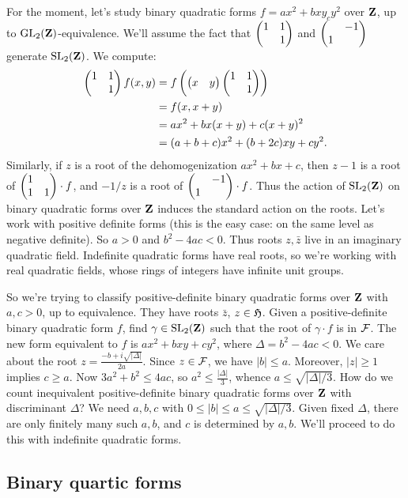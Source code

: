 For the moment, let's study binary quadratic forms $f=a x^2+b x y_c y^2$ 
over $\mathbf{Z}$, up to $\operatorname{GL}_2(\mathbf{Z})$-equivalence. We'll assume the fact that 
$\begin{pmatrix} 1 & 1 \\  & 1 \end{pmatrix}$ and $\begin{pmatrix}  & -1 \\ 1 &  \end{pmatrix}$ generate $\operatorname{SL}_2(\mathbf{Z})$. We compute: 
\begin{align*}
  \begin{pmatrix} 1 & 1 \\  & 1 \end{pmatrix} f(x,y) &= f\left(\begin{pmatrix} x & y \end{pmatrix} \begin{pmatrix} 1 & 1 \\  & 1 \end{pmatrix}\right) \\
    &= f(x,x+y) \\
    &= a x^2+b x(x+y)+c(x+y)^2 \\
    &= (a+b+c) x^2 +(b+2 c) x y + c y^2 .
\end{align*}
Similarly, if $z$ is a root of the dehomogenization 
$a x^2+b x+c$, then $z-1$ is a root of $\begin{pmatrix} 1 &  \\ 1 & 1 \end{pmatrix}\cdot f$, and 
$-1/z$ is a root of $\begin{pmatrix}  & -1 \\ 1 &  \end{pmatrix}\cdot f$. Thus the action of $\operatorname{SL}_2(\mathbf{Z})$ 
on binary quadratic forms over $\mathbf{Z}$ induces the standard action on the roots. 
Let's work with positive definite forms (this is the easy case: on the same 
level as negative definite). So $a>0$ and $b^2-4 a c<0$. Thus roots 
$z,\bar z$ live in an imaginary quadratic field. Indefinite quadratic forms 
have real roots, so we're working with real quadratic fields, whose rings of 
integers have infinite unit groups. 

So we're trying to classify positive-definite binary quadratic forms over $\mathbf{Z}$ 
with $a,c>0$, up to equivalence. They have roots $\bar z$, $z\in \mathfrak{H}$. 
Given a positive-definite binary quadratic form $f$, find 
$\gamma\in \operatorname{SL}_2(\mathbf{Z})$ such that the root of $\gamma\cdot f$ is in $\mathcal{F}$. The 
new form equivalent to $f$ is $a x^2+b x y+c y^2$, where 
$\Delta=b^2-4 a c<0$. We care about the root 
$z=\frac{-b+i\sqrt{|\Delta|}}{2a}$. Since $z\in \mathcal{F}$, we have 
$|b|\leqslant a$. Moreover, $|z|\geqslant 1$ implies 
$c\geqslant a$. Now 
$3 a^2+b^2\leqslant 4 a c$, so 
$a^2\leqslant \frac{|\Delta|}{3}$, whence $a\leqslant \sqrt{|\Delta|/3}$. 
How do we count inequivalent positive-definite binary quadratic forms over 
$\mathbf{Z}$ with discriminant $\Delta$? We need $a,b,c$ with 
$0\leqslant |b|\leqslant a \leqslant \sqrt{|\Delta|/3}$. Given fixed 
$\Delta$, there are only finitely many such $a,b$, and $c$ is determined by 
$a,b$. We'll proceed to do this with indefinite quadratic forms. 





\subsection{Binary quartic forms}

